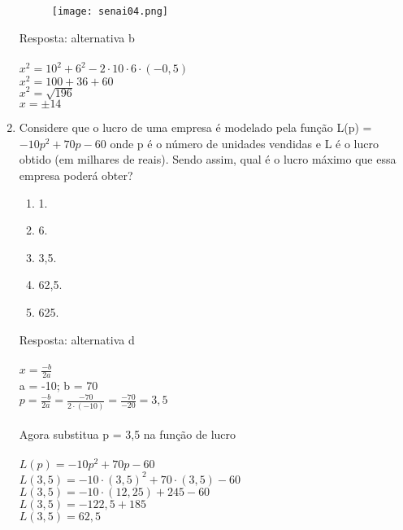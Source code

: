 \documentclass[a4paper,14pt]{article}
\begin{document}
\begin{enumerate}
        \begin{figure}[h] %
    	\centering
    	\texttt{[image: senai04.png]} %
        \end{figure}
    
        Resposta: alternativa b \\ \\
        $x^2 = 10^2 + 6^2 - 2 \cdot 10 \cdot 6 \cdot (-0,5)$ \\
        $x^2 = 100 + 36 + 60$ \\
        $x^2 = \sqrt{196}$ \\
        $x = \pm{14}$
        \newline
        \item Considere que o lucro de uma empresa é modelado pela função
        L(p) = $-10p^2 + 70p - 60$
        onde p é o número de unidades vendidas e L é o lucro obtido (em milhares de reais).
        Sendo assim, qual é o lucro máximo que essa empresa poderá obter?
        \begin{enumerate}
        	\item 1.
        	\item 6.
        	\item 3,5.
        	\item 62,5.
        	\item 625.
        \end{enumerate}
        Resposta: alternativa d \\ \\
        $x = \frac{-b}{2a}$ \\
        a = -10; b = 70 \\
        $p = \frac{-b}{2a} = \frac{-70}{2 \cdot (-10)} = \frac{-70}{-20} = 3,5$ \\
        \\
        Agora substitua p = 3,5 na função de lucro \\
        \\
        $L(p) = -10p^2 + 70p - 60$ \\
        $L(3,5) = -10 \cdot (3,5)^2 + 70 \cdot (3,5) - 60$ \\
        $L(3,5) = -10 \cdot (12,25) + 245 - 60$ \\
        $L(3,5) = -122,5 + 185$ \\
        $L(3,5) = 62,5$ \\ \\
        

\end{enumerate}
\end{document}
